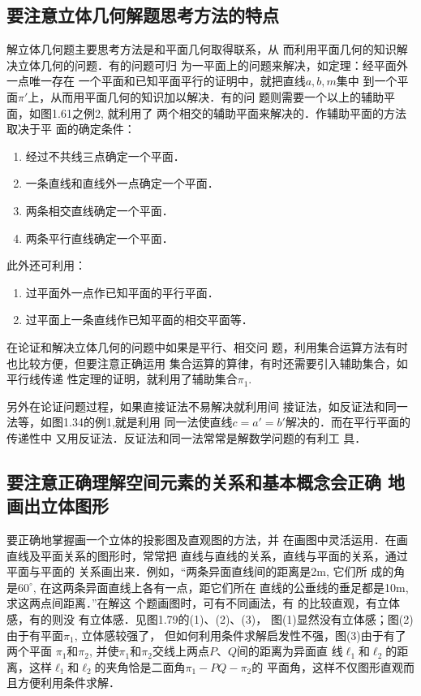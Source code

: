 \subsection{要注意立体几何解题思考方法的特点}
解立体几何题主要思考方法是和平面几何取得联系，从
而利用平面几何的知识解决立体几何的问题．有的问题可归
为一平面上的问题来解决，如定理：经平面外一点唯一存在
一个平面和已知平面平行的证明中，就把直线$a,b,m$集中
到一个平面$\pi'$上，从而用平面几何的知识加以解决．有的问
题则需要一个以上的辅助平面，如图1.61之例2, 就利用了
两个相交的辅助平面来解决的．作辅助平面的方法取决于平
面的确定条件：
\begin{enumerate}
\item 经过不共线三点确定一个平面．
\item 一条直线和直线外一点确定一个平面．
\item 两条相交直线确定一个平面．
\item 两条平行直线确定一个平面．
\end{enumerate}

此外还可利用：
\begin{enumerate}
\item 过平面外一点作已知平面的平行平面．
\item 过平面上一条直线作已知平面的相交平面等．
\end{enumerate}

在论证和解决立体几何的问题中如果是平行、相交问
题，利用集合运算方法有时也比较方便，但要注意正确运用
集合运算的算律，有时还需要引入辅助集合，如平行线传递
性定理的证明，就利用了辅助集合$\pi_1$. 

另外在论证问题过程，如果直接证法不易解决就利用间
接证法，如反证法和同一法等，如图1.34的例1,就是利用
同一法使直线$c=a'=b'$解决的．而在平行平面的传递性中
又用反证法．反证法和同一法常常是解数学问题的有利工
具．

\subsection{要注意正确理解空间元素的关系和基本概念会正确
地画出立体图形}
要正确地掌握画一个立体的投影图及直观图的方法，并
在画图中灵活运用．在画直线及平面关系的图形时，常常把
直线与直线的关系，直线与平面的关系，通过平面与平面的
关系画出来．例如，“两条异面直线间的距离是2m, 它们所
成的角是$60^{\circ}$, 在这两条异面直线上各有一点，距它们所在
直线的公垂线的垂足都是10m, 求这两点间距离．”在解这
个题画图时，可有不同画法，有
的比较直观，有立体感，有的则没
有立体感．见图1.79的(1)、(2)、(3)，
图(1)显然没有立体感；图(2)
由于有平面$\pi_1$, 立体感较强了，
但如何利用条件求解启发性不强，图(3)由于有了两个平面
$\pi_1$和$\pi_2$, 并使$\pi_1$和$\pi_2$交线上两点$P$、$Q$间的距离为异面直
线$\ell_1$和$\ell_2$的距离，这样$\ell_1$和$\ell_2$的夹角恰是二面角$\pi_1-PQ-\pi_2$的
平面角，这样不仅图形直观而且方便利用条件求解．

